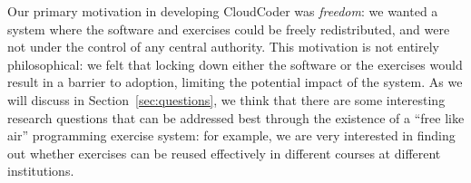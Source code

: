 \documentclass{sig-alternate}
\begin{document}
%
%
%
%

Our primary motivation in developing CloudCoder
was {\em freedom}: we wanted a system where
the software and exercises could be freely redistributed, and
were not under the control of any central authority.  This motivation
is not entirely philosophical: we felt that locking down either
the software or the exercises would result in a barrier to adoption,
limiting the potential impact of the system.
As we will discuss in Section~\ref{sec:questions}, we think that there
are some interesting research questions that can be addressed
best through the existence of a ``free like air'' programming
exercise system: for example, we are very interested in finding out
whether exercises can be reused effectively in different courses
at different institutions.
\end{document}
